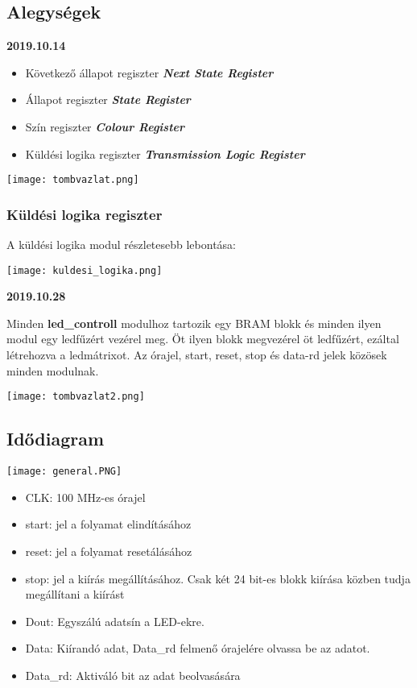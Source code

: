 \documentclass[10pt]{article} %
\begin{document}
\subsection{Alegységek}

\textbf{2019.10.14}
\begin{itemize}
\item Következő állapot regiszter \textbf{\textit{Next State Register}}
\item Állapot regiszter \textbf{\textit{State Register}}
\item Szín regiszter \textbf{\textit{Colour Register}}
\item Küldési logika regiszter \textbf{\textit{Transmission Logic Register}}
\end{itemize}

\texttt{[image: tombvazlat.png]}

\subsubsection{Küldési logika regiszter}

\noindent A küldési logika modul részletesebb lebontása: 

\texttt{[image: kuldesi\_logika.png]}

\textbf{2019.10.28}

\indent Minden \textbf{led\_controll} modulhoz tartozik egy BRAM blokk és minden ilyen modul egy ledfűzért vezérel meg. Öt ilyen blokk megvezérel öt ledfűzért, ezáltal létrehozva a ledmátrixot.
Az órajel, start, reset, stop és data-rd jelek közösek minden modulnak.

\texttt{[image: tombvazlat2.png]}

\subsection{Idődiagram}

\texttt{[image: general.PNG]}

\begin{itemize}
\item CLK: 100 MHz-es órajel
\item start: jel a folyamat elindításához
\item reset: jel a folyamat resetálásához
\item stop: jel a kiírás megállításához. Csak két 24 bit-es blokk kiírása közben tudja megállítani a kiírást
\item Dout: Egyszálú adatsín a LED-ekre.
\item Data: Kiírandó adat, Data\_rd felmenő órajelére olvassa be az adatot.
\item Data\_rd: Aktiváló bit az adat beolvasására
\end{itemize}
\end{document}
